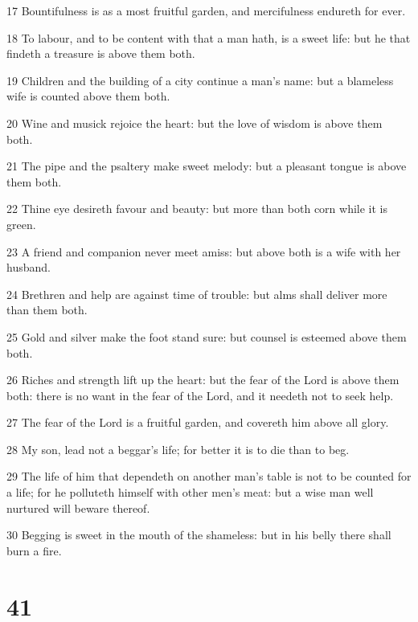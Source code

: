 \par 17 Bountifulness is as a most fruitful garden, and mercifulness endureth for ever.
\par 18 To labour, and to be content with that a man hath, is a sweet life: but he that findeth a treasure is above them both.
\par 19 Children and the building of a city continue a man's name: but a blameless wife is counted above them both.
\par 20 Wine and musick rejoice the heart: but the love of wisdom is above them both.
\par 21 The pipe and the psaltery make sweet melody: but a pleasant tongue is above them both.
\par 22 Thine eye desireth favour and beauty: but more than both corn while it is green.
\par 23 A friend and companion never meet amiss: but above both is a wife with her husband.
\par 24 Brethren and help are against time of trouble: but alms shall deliver more than them both.
\par 25 Gold and silver make the foot stand sure: but counsel is esteemed above them both.
\par 26 Riches and strength lift up the heart: but the fear of the Lord is above them both: there is no want in the fear of the Lord, and it needeth not to seek help.
\par 27 The fear of the Lord is a fruitful garden, and covereth him above all glory.
\par 28 My son, lead not a beggar's life; for better it is to die than to beg.
\par 29 The life of him that dependeth on another man's table is not to be counted for a life; for he polluteth himself with other men's meat: but a wise man well nurtured will beware thereof.
\par 30 Begging is sweet in the mouth of the shameless: but in his belly there shall burn a fire.

\chapter{41}

